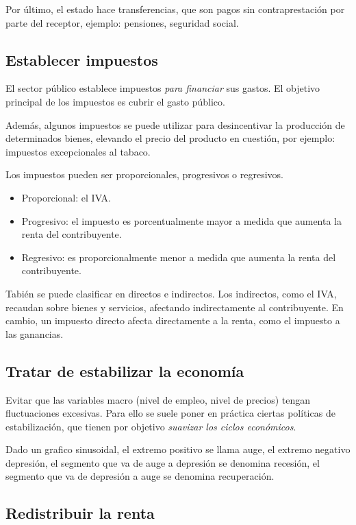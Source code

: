 Por último,
el estado hace transferencias,
que son pagos sin contraprestación por parte del receptor,
ejemplo:
pensiones, seguridad social.

\subsection{Establecer impuestos}

El sector público establece impuestos \textit{para financiar} sus gastos.
El objetivo principal de los impuestos es cubrir el gasto público.

Además,
algunos impuestos se puede utilizar para desincentivar la producción de determinados bienes,
elevando el precio del producto en cuestión,
por ejemplo: impuestos excepcionales al tabaco.

Los impuestos pueden ser proporcionales, progresivos o regresivos.
\begin{itemize}
    \item Proporcional: el IVA.
    \item Progresivo: el impuesto es porcentualmente mayor
          a medida que aumenta la renta del contribuyente.
    \item Regresivo: es proporcionalmente menor a medida que
          aumenta la renta del contribuyente.
\end{itemize}

Tabién se puede clasificar en directos e indirectos.
Los indirectos,
como el IVA,
recaudan sobre bienes y servicios,
afectando indirectamente al contribuyente.
En cambio,
un impuesto directo afecta directamente a la renta,
como el impuesto a las ganancias.

\subsection{Tratar de estabilizar la economía}

Evitar que las variables macro
(nivel de empleo, nivel de precios)
tengan fluctuaciones excesivas.
Para ello se suele poner en práctica ciertas políticas de estabilización,
que tienen por objetivo \textit{suavizar los ciclos económicos}.

Dado un grafico sinusoidal,
el extremo positivo se llama auge,
el extremo negativo depresión,
el segmento que va de auge a depresión se denomina recesión,
el segmento que va de depresión a auge se denomina recuperación.

\subsection{Redistribuir la renta}

